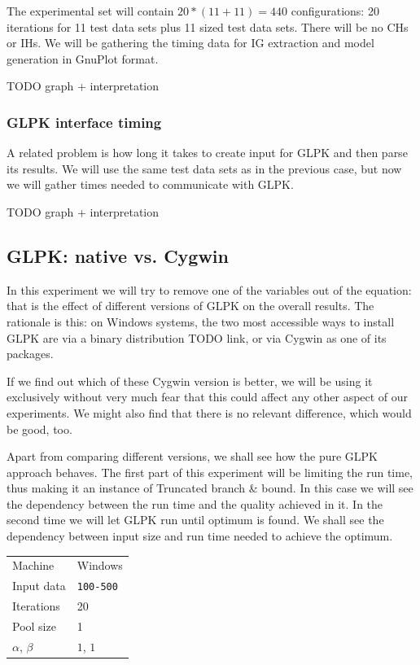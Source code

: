 The experimental set will contain $20 * (11 + 11) = 440$ configurations: 20 iterations for 11 test data sets plus 11 sized test data sets. There will be no CHs or IHs. We will be gathering the timing data for IG extraction and model generation in GnuPlot format.

TODO graph + interpretation

\subsubsection{GLPK interface timing}


A related problem is how long it takes to create input for GLPK and then parse its results. We will use the same test data sets as in the previous case, but now we will gather times needed to communicate with GLPK.

TODO graph + interpretation

\subsection{GLPK: native vs. Cygwin}


In this experiment we will try to remove one of the variables out of the equation: that is the effect of different versions of GLPK on the overall results. The rationale is this: on Windows systems, the two most accessible ways to install GLPK are via a binary distribution TODO link, or via Cygwin as one of its packages.

If we find out which of these Cygwin version is better, we will be using it exclusively without very much fear that this could affect any other aspect of our experiments. We might also find that there is no relevant difference, which would be good, too.

Apart from comparing different versions, we shall see how the pure GLPK approach behaves. The first part of this experiment will be limiting the run time, thus making it an instance of Truncated branch \& bound. In this case we will see the dependency between the run time and the quality achieved in it. In the second time we will let GLPK run until optimum is found. We shall see the dependency between input size and run time needed to achieve the optimum.

\begin{center}
\bigskip
\begin{tabular}{| l | l |}
  \hline
  \hline
  Machine           & Windows \\
  Input data        & \texttt{100-500} \\
  Iterations        & 20 \\
  Pool size         & 1 \\
  $\alpha$, $\beta$ & $1$, $1$ \\
  \hline
\end{tabular}
\bigskip
\end{center}

